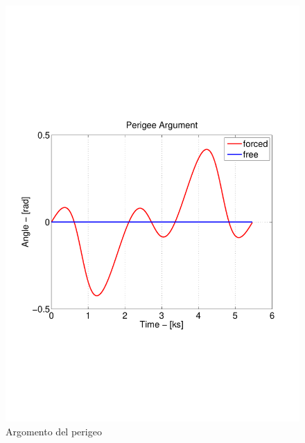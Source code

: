 \begin{figure}[h]
\begin{center}
  \includegraphics[width=\textwidth,clip=true,trim=1cm 6.5cm 1cm 8cm]
  {modelling/orbit_dynamics/image/perigee_argument.pdf}
  \caption{Argomento del perigeo}
\end{center}
\end{figure}

